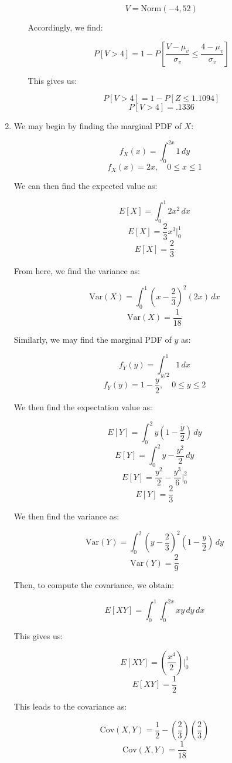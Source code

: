 \begin{enumerate}
\begin{enumerate}
        $$V=\text{Norm}(-4, 52)$$

        Accordingly, we find:

        $$P[V>4]=1-P\left[ \frac{V-\mu_v}{\sigma_v} \leq \frac{4-\mu_v}{\sigma_v} \right]$$

        This gives us:

        $$P[V>4]=1-P\left[ Z \leq 1.1094 \right]$$
        $$\boxed{P[V>4]=.1336}$$

    \end{enumerate}

  \item We may begin by finding the marginal PDF of $X$:

    $$f_X(x)=\int_0^{2x} 1\,dy$$
    $$f_X(x)=2x,\quad 0\leq x\leq 1$$

    We can then find the expected value as:

    $$E[X]=\int_0^1 2x^2\,dx$$
    $$E[X]=\frac{2}{3}x^3\Big|_0^1$$
    $$E[X]=\frac{2}{3}$$

    From here, we find the variance as:

    $$\text{Var}(X)=\int_{0}^1 \left( x-\frac{2}{3} \right)^2 (2x)\,dx$$
    $$\boxed{\text{Var}(X)=\frac{1}{18}}$$

    Similarly, we may find the marginal PDF of $y$ as:

    $$f_Y(y)=\int_{y/2}^1 1\,dx$$
    $$f_Y(y)=1-\frac{y}{2},\quad 0\leq y\leq 2$$

    We then find the expectation value as:

    $$E[Y]=\int_0^2 y\left( 1-\frac{y}{2} \right)\,dy$$
    $$E[Y]=\int_0^2 y-\frac{y^2}{2}\,dy$$
    $$E[Y]=\frac{y^2}{2}-\frac{y^3}{6}\Big|_0^2$$
    $$E[Y]=\frac{2}{3}$$

    We then find the variance as:

    $$\text{Var}(Y)=\int_0^2 \left( y-\frac{2}{3} \right)^2\left( 1-\frac{y}{2} \right)\,dy$$
    $$\boxed{\text{Var}(Y)=\frac{2}{9}}$$

    Then, to compute the covariance, we obtain:

    $$E[XY]=\int_0^1\int_0^{2x} xy\,dy\,dx$$

    This gives us:

    $$E[XY]=\left( \frac{x^4}{2} \right)\Big|_0^1$$
    $$E[XY]=\frac{1}{2}$$

    This leads to the covariance as:

    $$\text{Cov}(X,Y)=\frac{1}{2}-\left( \frac{2}{3} \right)\left( \frac{2}{3} \right)$$
    $$\boxed{\text{Cov}(X,Y)=\frac{1}{18}}$$


\end{enumerate}
